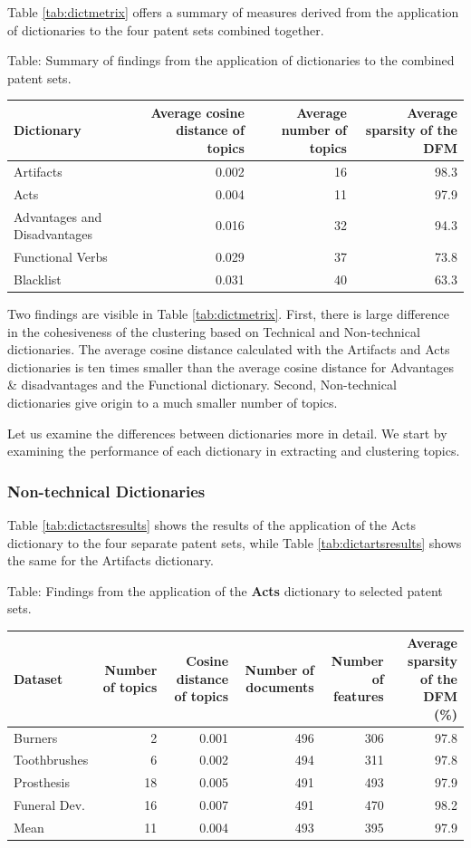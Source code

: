 \documentclass[]{book}
\begin{document}
Table \ref{tab:dictmetrix} offers a summary of measures derived from the
application of dictionaries to the four patent sets combined together.

Table: \label{tab:dictmetrix} Summary of findings from the application of
dictionaries to the combined patent sets.

\begin{tabular}{l|r|r|r}
\hline
Dictionary & Average cosine distance of topics & Average number of topics & Average sparsity of the DFM\\
\hline
Artifacts & 0.002 & 16 & 98.3\\
\hline
Acts & 0.004 & 11 & 97.9\\
\hline
Advantages and Disadvantages & 0.016 & 32 & 94.3\\
\hline
Functional Verbs & 0.029 & 37 & 73.8\\
\hline
Blacklist & 0.031 & 40 & 63.3\\
\hline
\end{tabular}

Two findings are visible in Table \ref{tab:dictmetrix}. First, there is
large difference in the cohesiveness of the clustering based on
Technical and Non-technical dictionaries. The average cosine distance
calculated with the Artifacts and Acts dictionaries is ten times smaller
than the average cosine distance for Advantages \& disadvantages and the
Functional dictionary. Second, Non-technical dictionaries give origin to
a much smaller number of topics.

Let us examine the differences between dictionaries more in detail. We
start by examining the performance of each dictionary in extracting and
clustering topics.

\subsubsection*{Non-technical
Dictionaries}\label{non-technical-dictionaries}

Table \ref{tab:dictactsresults} shows the results of the application of
the Acts dictionary to the four separate patent sets, while Table
\ref{tab:dictartsresults} shows the same for the Artifacts dictionary.

Table: \label{tab:dictactsresults} Findings from the application of the
\textbf{Acts} dictionary to selected patent sets.

\begin{tabular}{l|r|r|r|r|r}
\hline
Dataset & Number of topics & Cosine distance of topics & Number of documents & Number of features & Average sparsity of the DFM (\%)\\
\hline
Burners & 2 & 0.001 & 496 & 306 & 97.8\\
\hline
Toothbrushes & 6 & 0.002 & 494 & 311 & 97.8\\
\hline
Prosthesis & 18 & 0.005 & 491 & 493 & 97.9\\
\hline
Funeral Dev. & 16 & 0.007 & 491 & 470 & 98.2\\
\hline
Mean & 11 & 0.004 & 493 & 395 & 97.9\\
\hline
\end{tabular}
\end{document}
